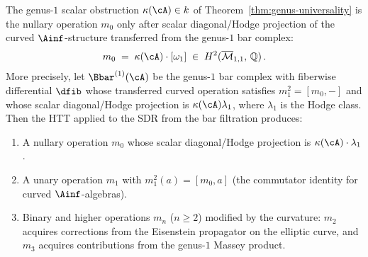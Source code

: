 \begin{proposition}
\label{prop:genus1-curvature-m0}
The genus-$1$ scalar obstruction $\kappa(\cA) \in k$ of
Theorem~\textup{\ref{thm:genus-universality}} is the nullary
operation $m_0$ only after scalar diagonal/Hodge projection of the
curved $\Ainf$-structure transferred from the genus-$1$ bar complex:
\[
m_0 \;=\; \kappa(\cA) \cdot [\omega_1]
\;\in\; H^2(\overline{\mathcal{M}}_{1,1},\, \mathbb{Q})\,.
\]
More precisely, let $\Bbar^{(1)}(\cA)$ be the genus-$1$ bar complex
with fiberwise differential $\dfib$ whose transferred curved operation
satisfies $m_1^2=[m_0,-]$ and whose scalar diagonal/Hodge projection is
$\kappa(\cA)\lambda_1$, where $\lambda_1$ is the Hodge class. Then the
HTT applied to the SDR from the bar
filtration produces:
\begin{enumerate}[label=(\roman*)]
\item A nullary operation $m_0$ whose scalar diagonal/Hodge projection is
$\kappa(\cA) \cdot \lambda_1$.
\item A unary operation $m_1$ with $m_1^2(a) = [m_0, a]$
(the commutator identity for curved $\Ainf$-algebras).
\item Binary and higher operations $m_n$ ($n \geq 2$) modified
by the curvature: $m_2$ acquires corrections from the
Eisenstein propagator on the elliptic curve, and $m_3$
acquires contributions from the genus-$1$ Massey product.
\end{enumerate}
\end{proposition}

